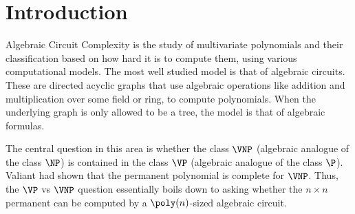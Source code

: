 





































































\section{Introduction}
Algebraic Circuit Complexity is the study of multivariate polynomials and their classification based on how hard it is to compute them, using various computational models. 
The most well studied model is that of algebraic circuits. 
These are directed acyclic graphs that use algebraic operations like addition and multiplication over some field or ring, to compute polynomials. 
When the underlying graph is only allowed to be a tree, the model is that of algebraic formulas.

The central question in this area is whether the class $\VNP$ (algebraic analogue of the class $\NP$) is contained in the class $\VP$ (algebraic analogue of the class $\P$).
Valiant \cite{V79} had shown that the permanent polynomial is complete for $\VNP$.
Thus, the $\VP$ vs $\VNP$ question essentially boils down to asking whether the $n \times n$ permanent can be computed by a $\poly(n)$-sized algebraic circuit.

